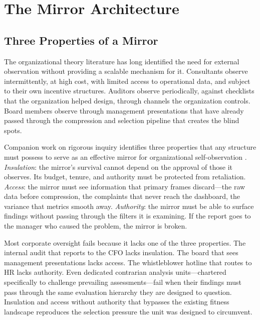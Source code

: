 \documentclass[11pt,a4paper]{article}
\begin{document}
\section{The Mirror Architecture}
\label{sec:mirror}

\subsection{Three Properties of a Mirror}
\label{sec:mirror-properties}

The organizational theory literature has long identified the need for external observation without providing a scalable mechanism for it. Consultants observe intermittently, at high cost, with limited access to operational data, and subject to their own incentive structures. Auditors observe periodically, against checklists that the organization helped design, through channels the organization controls. Board members observe through management presentations that have already passed through the compression and selection pipeline that creates the blind spots.

Companion work on rigorous inquiry identifies three properties that any structure must possess to serve as an effective mirror for organizational self-observation \citep{mcentire2026}. \emph{Insulation}: the mirror's survival cannot depend on the approval of those it observes. Its budget, tenure, and authority must be protected from retaliation. \emph{Access}: the mirror must see information that primary frames discard---the raw data before compression, the complaints that never reach the dashboard, the variance that metrics smooth away. \emph{Authority}: the mirror must be able to surface findings without passing through the filters it is examining. If the report goes to the manager who caused the problem, the mirror is broken.

Most corporate oversight fails because it lacks one of the three properties. The internal audit that reports to the CFO lacks insulation. The board that sees management presentations lacks access. The whistleblower hotline that routes to HR lacks authority. Even dedicated contrarian analysis units---chartered specifically to challenge prevailing assessments---fail when their findings must pass through the same evaluation hierarchy they are designed to question. Insulation and access without authority that bypasses the existing fitness landscape reproduces the selection pressure the unit was designed to circumvent.
\end{document}
